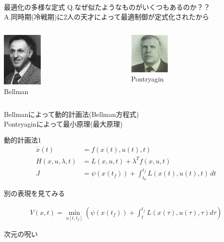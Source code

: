\documentclass[dvipdfmx,12pt]{beamer}
\begin{document}
    \begin{frame}{最適化の多様な定式}
        Q.なぜ似たようなものがいくつもあるのか？？\\

        A.同時期(冷戦期)に2人の天才によって最適制御が定式化されたから\\

        \begin{columns}

            \begin{column}{0.5\textwidth}
                \centering
                \includegraphics[clip, width = 2.0cm]{Bellman.png}\\
                {\tiny Bellman}
            \end{column}
        
            \begin{column}{0.5\textwidth}
                \centering
                \includegraphics[clip, width = 2.0cm]{Pontryagin.png}\\
                {\tiny Pontryagin}
            \end{column}
        \end{columns}

        Bellmanによって動的計画法(Bellman方程式)\\

        Pontryaginによって最小原理(最大原理)\\

    \end{frame}

    \begin{frame}{動的計画法1}
        \footnotesize
        \begin{align*}
            \dot{x}(t) &= f(x(t), u(t), t) \\
            H(x, u, \lambda, t) &= L(x, u, t) + \lambda^T f(x, u, t) \\
            J &= \psi(x(t_f)) + \int_{t_0}^{t_f} L(x(t), u(t), t) \, dt
        \end{align*}
    
        別の表現を見てみる
    
        \begin{align*}
            V(x, t) = \min_{u[t, t_f]} \left( \psi(x(t_f)) + \int_t^{t_f} L(x(\tau), u(\tau), \tau) d\tau \right)
        \end{align*}
    


        次元の呪い
    
    \end{frame}
\end{document}

